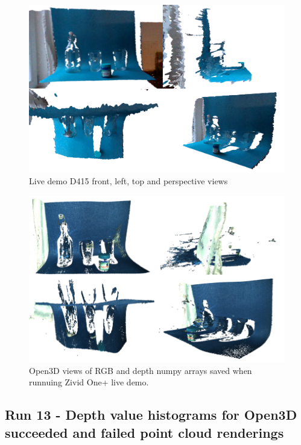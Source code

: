 \begin{figure}[h!]
\centering
\includegraphics[width=\textwidth]{Figures/D415LiveDemoIsometric.png}
\caption{Live demo D415 front, left, top and perspective views}
\label{fig:D415LiveDemoIsometric}
\end{figure}

\begin{figure}[h!]
\centering
\includegraphics[width=\textwidth]{Figures/ZividoLiveDemoIsometric_1.png}
\caption{Open3D views of RGB and depth numpy arrays saved when runnuing Zivid One+ live demo.}
\label{fig:ZividoLiveDemoIsometric_1}
\end{figure}

\subsection{Run 13 - Depth value histograms for Open3D succeeded and failed point cloud renderings}
\label{app_res:13}

